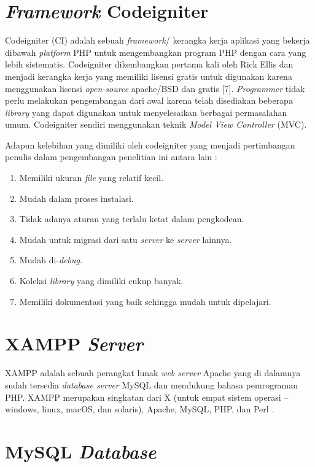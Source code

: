 \section{\emph{Framework} Codeigniter} 

Codeigniter (CI) adalah sebuah \emph{framework}/ kerangka kerja aplikasi yang bekerja dibawah \emph{platform} PHP untuk mengembangkan program PHP dengan cara yang lebih sistematis. Codeigniter dikembangkan pertama kali oleh Rick Ellis dan menjadi kerangka kerja yang memiliki lisensi gratis untuk digunakan karena menggunakan lisensi \emph{open-source} apache/BSD dan gratis [7]. \textit{Programmer} tidak perlu melakukan pengembangan dari awal karena telah disediakan beberapa \emph{library} yang dapat digunakan untuk menyelesaikan berbagai permasalahan umum. Codeigniter sendiri menggunakan teknik \emph{Model View Controller} (MVC).

Adapun kelebihan yang dimiliki oleh codeigniter yang menjadi pertimbangan penulis dalam pengembangan penelitian ini antara lain \cite{yicheng} :

\begin{enumerate}
	\item Memiliki ukuran \emph{file} yang relatif kecil.
	\item Mudah dalam proses instalasi. 
	\item Tidak adanya aturan yang terlalu ketat dalam pengkodean.
	\item Mudah untuk migrasi dari satu \emph{server} ke \emph{server} lainnya.
	\item Mudah di-\emph{debug}.
	\item Koleksi \emph{library} yang dimiliki cukup banyak.
	\item Memiliki dokumentasi yang baik sehingga mudah untuk dipelajari.
\end{enumerate}

\section{XAMPP \emph{Server}}

XAMPP adalah sebuah perangkat lunak \emph{web server} Apache yang di dalamnya sudah tersedia \emph{database server} MySQL dan mendukung bahasa pemrograman PHP. XAMPP merupakan singkatan dari X (untuk empat sistem operasi – windows, linux, macOS, dan solaris), Apache, MySQL, PHP, dan Perl \cite{binarso}.

\section{MySQL \emph{Database}}

